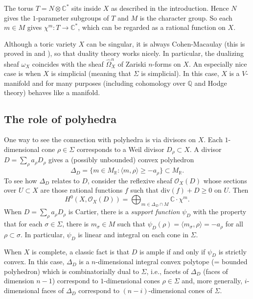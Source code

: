 \documentclass{amsart}
\theoremstyle{plain}
\theoremstyle{definition}
\begin{document}
	The torus $T = N\otimes\mathbb{C}^*$ sits inside $X$ as
described in the introduction.  Hence $N$ gives the $1$-parameter
subgroups of $T$ and $M$ is the character group.  So each $m \in M$
gives $\chi^m : T \to {\mathbb{C}}^*$, which can be regarded as a
rational function on $X$.

	Although a toric variety $X$ can be singular, it is always
Cohen-Macaulay (this is proved in \cite{Hoc} and \cite{Dan2}), so that
duality theory works nicely.  In particular, the dualizing sheaf
$\omega_X$ coincides with the sheaf $\widehat\Omega^n_X$ of Zariski
$n$-forms on $X$.  An especially nice case is when $X$ is simplicial
(meaning that $\Sigma$ is simplicial).  In this case, $X$ is a
$V$-manifold and for many purposes (including cohomology over $\mathbb{Q}$ and Hodge theory) behaves like a manifold.

	\subsection{The role of polyhedra} One way to see the
connection with polyhedra is via divisors on $X$.  Each
$1$-dimensional cone $\rho \in \Sigma$ corresponds to a Weil divisor
$D_\rho \subset X$.  A divisor $D = \sum_\rho a_\rho D_\rho$ gives a
(possibly unbounded) convex polyhedron
\begin{equation}
\Delta_D = \{m \in M_{\mathbb{R}}: \langle m,\rho\rangle \ge -a_\rho\}
\subset M_{\mathbb{R}}.
\tag{1.1}\label{eq:1.1}
\end{equation}
To see how $\Delta_D$ relates to $D$, consider the reflexive sheaf
$\mathcal{O}_X(D)$ whose sections over $U \subset X$ are those rational
functions $f$ such that $\mathrm{div}(f) + D \ge 0$ on $U$.  Then
\begin{equation}
H^0(X,\mathcal{O}_X(D)) = \bigoplus_{m \in \Delta_D\cap M} \mathbb{C}\cdot
\chi^m.
\tag{1.2}\label{eq:1.2}
\end{equation}
When $D = \sum_\rho a_\rho D_\rho$ is Cartier, there is a {\it support
function\/} $\psi_D$ with the property that for each $\sigma \in
\Sigma$, there is $m_\sigma \in M$ such that $\psi_D(\rho) = \langle
m_\sigma,\rho\rangle = -a_\rho$ for all $\rho \subset \sigma$.  In
particular, $\psi_D$ is linear and integral on each cone in $\Sigma$.

	When $X$ is complete, a classic fact is that $D$ is ample if
and only if $\psi_D$ is strictly convex.  In this case, $\Delta_D$ is
a $n$-dimensional integral convex polytope (= bounded polyhedron)
which is combinatorially dual to $\Sigma$, i.e., facets of $\Delta_D$
(faces of dimension $n-1$) correspond to $1$-dimensional cones $\rho
\in \Sigma$ and, more generally, $i$-dimensional faces of $\Delta_D$
correspond to $(n-i)$-dimensional cones of $\Sigma$.  
\end{document}
